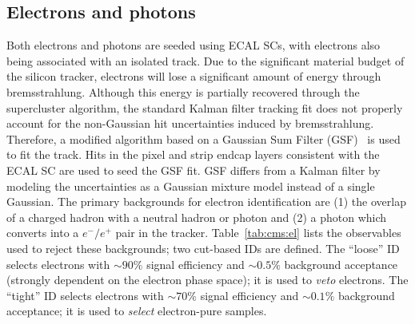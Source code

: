 \subsection{Electrons and photons}

Both electrons and photons are seeded using ECAL SCs, with electrons also being associated with an isolated track.
Due to the significant material budget of the silicon tracker, electrons will lose a significant amount of energy through bremsstrahlung.
Although this energy is partially recovered through the supercluster algorithm, the standard Kalman filter tracking fit does not properly account for the non-Gaussian hit uncertainties induced by bremsstrahlung.
Therefore, a modified algorithm based on a Gaussian Sum Filter (GSF)~\cite{cmstracker,gsf} is used to fit the track.
Hits in the pixel and strip endcap layers consistent with the ECAL SC are used to seed the GSF fit.
GSF differs from a Kalman filter by modeling the uncertainties as a Gaussian mixture model instead of a single Gaussian.
The primary backgrounds for electron identification are (1) the overlap of a charged hadron with a neutral hadron or photon and (2) a photon which converts into a $e^-/e^+$ pair in the tracker.
Table~\ref{tab:cms:el} lists the observables used to reject these backgrounds; two cut-based IDs are defined.
The ``loose'' ID selects electrons with $\sim90\%$ signal efficiency and $\sim0.5\%$ background acceptance (strongly dependent on the electron phase space); it is used to \emph{veto} electrons. 
The ``tight'' ID selects electrons with $\sim70\%$ signal efficiency and $\sim0.1\%$ background acceptance; it is used to \emph{select} electron-pure samples. 

